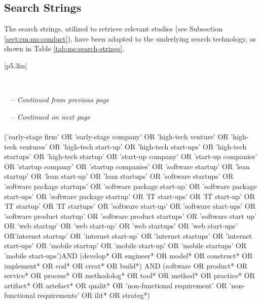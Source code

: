 \documentclass[final,5p,times,twocolumn]{elsarticle}
\begin{document}
\appendix
\label{sect:app}

\subsection{Search Strings}
\label{sub:a_search_string}
The search strings, utilized to retrieve relevant studies (see Subsection \ref{sect:rm:ms:conduct}), have been adapted to the underlying search technology, as shown in  Table \ref{tab:ms:search-strings}.


\onecolumn
\scriptsize
\begin{longtable}{|p{5.3in}|}
\hline    \hline 


 \\
\hline 

 \endfirsthead

	{\tablename\ \thetable\ -- \textit{Continued from previous page}} \\
                \hline
\endhead


{\tablename\ \thetable\ -- \textit{Continued on next page}} \\
\endfoot
\endlastfoot
\hspace{1in}\\
('early-stage firm' OR 'early-stage company' OR 'high-tech venture' OR 'high-tech ventures' OR 'high-tech start-up' OR 'high-tech start-ups' OR 'high-tech startups' OR 'high-tech startup' OR 'start-up company' OR 'start-up companies' OR 'startup company' OR 'startup companies' OR 'software startup' OR 'lean startup' OR 'lean start-up' OR 'lean startups' OR 'software startups' OR 'software package startups' OR 'software package start-up' OR 'software package start-ups' OR 'software package startup' OR 'IT start-ups' OR 'IT start-up' OR 'IT startup' OR 'IT startups' OR 'software start-up' OR 'software start-ups' OR 'software product startup' OR 'software product startups' OR 'software start up' OR 'web startup' OR 'web start-up' OR 'web startups' OR 'web start-ups' OR'internet startup' OR 'internet start-up' OR 'internet startups' OR 'internet start-ups' OR 'mobile startup' OR 'mobile start-up' OR 'mobile startups' OR 'mobile start-ups')AND (develop* OR engineer* OR model* OR construct* OR implement* OR cod* OR creat* OR build*) AND (software OR product* OR service* OR process* OR methodolog* OR tool* OR method* OR practice* OR artifact* OR artefact*  OR qualit* OR 'non-functional requirement' OR 'non-functional requirements' OR ilit* OR strateg*)  \\
\hspace{3in}\\
\hline \hline 



\end{longtable}
\end{document}
